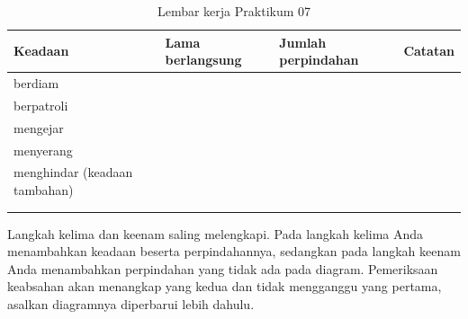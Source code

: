 \begin{table}[htbp]
\centering
\caption{Lembar kerja Praktikum 07}
\label{tab:lembar-praktikum-07}
{\setlength{\tabcolsep}{4pt}\footnotesize%
\begin{tabularx}{\textwidth}{@{}C{3.4cm} C{2.6cm} C{2.6cm} Y@{}}
\toprule
\headrow \textbf{Keadaan} & \textbf{Lama berlangsung} & \textbf{Jumlah perpindahan} & \textbf{Catatan} \\
\midrule
berdiam & & & \\[1.2em]
\addlinespace
berpatroli & & & \\[1.2em]
\addlinespace
mengejar & & & \\[1.2em]
\addlinespace
menyerang & & & \\[1.2em]
\addlinespace
menghindar (keadaan tambahan) & & & \\[1.2em]
\addlinespace
{} \\[1.4em]
\addlinespace
{} \\[1.4em]
\bottomrule
\end{tabularx}}
\end{table}

\begin{catatabox}
Langkah kelima dan keenam saling melengkapi. Pada langkah kelima Anda
menambahkan keadaan beserta perpindahannya, sedangkan pada langkah keenam Anda
menambahkan perpindahan yang tidak ada pada diagram. Pemeriksaan keabsahan akan
menangkap yang kedua dan tidak mengganggu yang pertama, asalkan diagramnya
diperbarui lebih dahulu.
\end{catatabox}
